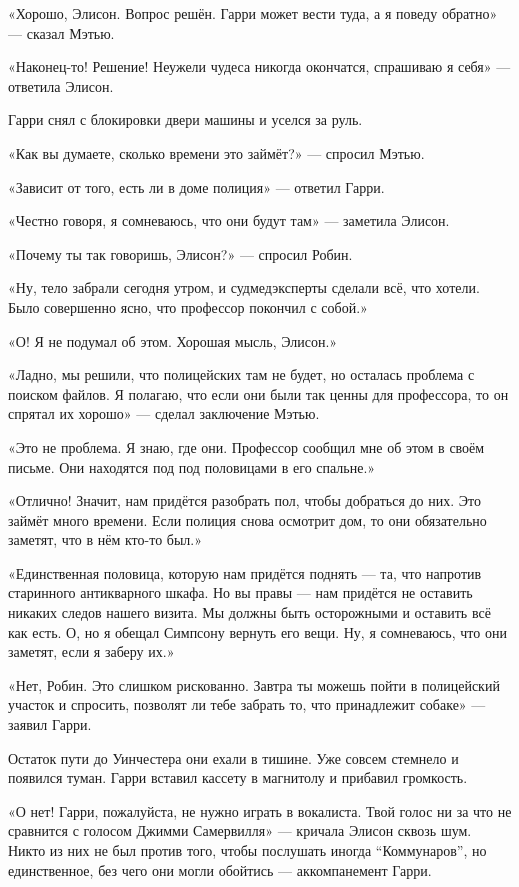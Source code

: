 \documentclass[a5paper, 9pt,
final, openany, twoside=true]{memoir}
\begin{document}
«Хорошо, Элисон. Вопрос решён. Гарри может вести туда, а я поведу обратно» — сказал Мэтью.

«Наконец-то! Решение! Неужели чудеса никогда окончатся, спрашиваю я себя» — ответила Элисон.

Гарри снял с блокировки двери машины и уселся за руль.

«Как вы думаете, сколько времени это займёт?» — спросил Мэтью.

«Зависит от того, есть ли в доме полиция» — ответил Гарри.

«Честно говоря, я сомневаюсь, что они будут там» — заметила Элисон.

«Почему ты так говоришь, Элисон?» — спросил Робин.

«Ну, тело забрали сегодня утром, и судмедэксперты сделали всё, что хотели. Было совершенно ясно, что профессор покончил с собой.»

«О! Я не подумал об этом. Хорошая мысль, Элисон.»

«Ладно, мы решили, что полицейских там не будет, но осталась проблема с поиском файлов. Я полагаю, что если они были так ценны для профессора, то он спрятал их хорошо» — сделал заключение Мэтью.

«Это не проблема. Я знаю, где они. Профессор сообщил мне об этом в своём письме. Они находятся под под половицами в его спальне.»

«Отлично! Значит, нам придётся разобрать пол, чтобы добраться до них. Это займёт много времени. Если полиция снова осмотрит дом, то они обязательно заметят, что в нём кто-то был.»

«Единственная половица, которую нам придётся поднять — та, что напротив старинного антикварного шкафа. Но вы правы — нам придётся не оставить никаких следов нашего визита. Мы должны быть осторожными и оставить всё как есть. О, но я обещал Симпсону вернуть его вещи. Ну, я сомневаюсь, что они заметят, если я заберу их.»

«Нет, Робин. Это слишком рискованно. Завтра ты можешь пойти в полицейский участок и спросить, позволят ли тебе забрать то, что принадлежит собаке» — заявил Гарри.\bigskip

Остаток пути до Уинчестера они ехали в тишине. Уже совсем стемнело и появился туман. Гарри вставил кассету в магнитолу и прибавил громкость.

«О нет! Гарри, пожалуйста, не нужно играть в вокалиста. Твой голос ни за что не сравнится с голосом Джимми Самервилля» — кричала Элисон сквозь шум. Никто из них не был против того, чтобы послушать иногда ``Коммунаров'', но единственное, без чего они могли обойтись — аккомпанемент Гарри.
\end{document}
